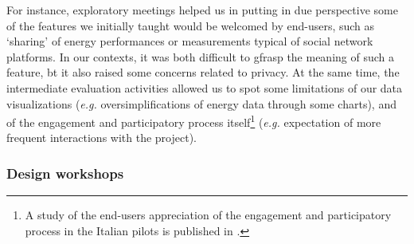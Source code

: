 For instance, exploratory meetings helped us in putting in due perspective some of the features we initially taught
would be welcomed by end-users, such as `sharing' of energy performances or measurements typical of social network platforms.
In our contexts, it was both difficult to gfrasp the meaning of such a feature, bt it also raised
some concerns related to privacy. At the same time, the intermediate evaluation activities allowed us to spot some
limitations of our data visualizations (\textit{e.g.} oversimplifications of energy data through some charts),
and of the engagement and participatory process itself\footnote{A study of the end-users appreciation of the engagement and participatory process in the Italian pilots
is published in \cite{capaccioli_exploring_2017}.}
(\textit{e.g.} expectation of more frequent interactions with the project).


\subsubsection{Design workshops} %


